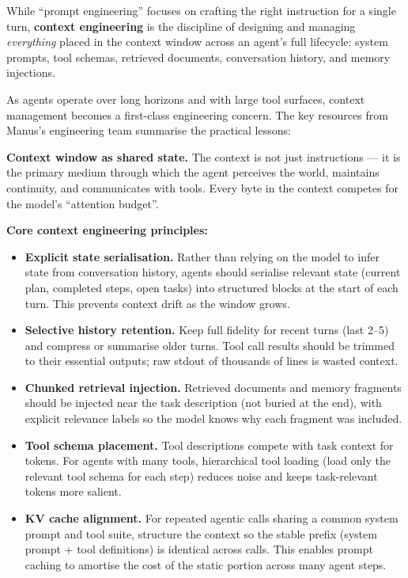 While ``prompt engineering'' focuses on crafting the right instruction for a single
turn, \textbf{context engineering} is the discipline of designing and managing
\emph{everything} placed in the context window across an agent's full lifecycle: system
prompts, tool schemas, retrieved documents, conversation history, and memory injections.

As agents operate over long horizons and with large tool surfaces, context management
becomes a first-class engineering concern. The key resources from Manus's engineering
team summarise the practical lessons:

\textbf{Context window as shared state.} The context is not just instructions --- it
is the primary medium through which the agent perceives the world, maintains continuity,
and communicates with tools. Every byte in the context competes for the model's
``attention budget''.

\textbf{Core context engineering principles:}
\begin{itemize}
  \item \textbf{Explicit state serialisation.} Rather than relying on the model to
    infer state from conversation history, agents should serialise relevant state
    (current plan, completed steps, open tasks) into structured blocks at the start
    of each turn. This prevents context drift as the window grows.

  \item \textbf{Selective history retention.} Keep full fidelity for recent turns
    (last 2--5) and compress or summarise older turns. Tool call results should be
    trimmed to their essential outputs; raw stdout of thousands of lines is wasted
    context.

  \item \textbf{Chunked retrieval injection.} Retrieved documents and memory fragments
    should be injected near the task description (not buried at the end), with explicit
    relevance labels so the model knows why each fragment was included.

  \item \textbf{Tool schema placement.} Tool descriptions compete with task context
    for tokens. For agents with many tools, hierarchical tool loading (load only the
    relevant tool schema for each step) reduces noise and keeps task-relevant tokens
    more salient.

  \item \textbf{KV cache alignment.} For repeated agentic calls sharing a common
    system prompt and tool suite, structure the context so the stable prefix (system
    prompt + tool definitions) is identical across calls. This enables prompt caching
    to amortise the cost of the static portion across many agent steps.
\end{itemize}

